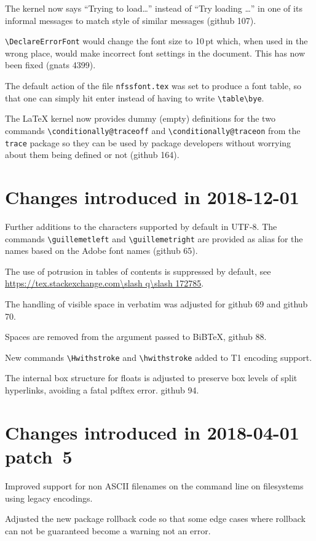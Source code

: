 \documentclass{ltxguide}
\newcommand\ghissue[1]{github #1}
\newcommand\gnatsissue[1]{gnats #1}
\newcommand\sxquestion[1]{\url{https://tex.stackexchange.com\slash q\slash #1}}
\newcommand\ghissue[1]{%
    \href{https://github.com/latex3/latex2e/issues/#1}{github #1}}
\newcommand\gnatsissue[1]{%
    \href{https://www.latex-project.org/cgi-bin/ltxbugs2html?pr=latex/#1}{gnats #1}}
\newcommand\sxquestion[1]{%
     \url{https://tex.stackexchange.com/q/#1}}
\begin{document}
The kernel now says ``Trying to load\ldots''
instead of ``Try loading \ldots'' in one of its informal
messages to match style of similar messages (\ghissue{107}).

\verb|\DeclareErrorFont| would change the font size to 10\,pt which, when
used in the wrong place, would make incorrect font settings in the document.
This has now been fixed (\gnatsissue{4399}).

The default action of the file \texttt{nfssfont.tex} was set to produce a
font table, so that one can simply hit enter instead of having to write
\verb=\table\bye=.

The \LaTeX{} kernel now provides dummy (empty) definitions for the two
commands \verb|\conditionally@traceoff| and
\verb|\conditionally@traceon| from the \texttt{trace} package so they
can be used by package developers without worrying about them being
defined or not (\ghissue{164}).





\section{Changes introduced in 2018-12-01}

Further additions to the characters supported by default in UTF-8.
The commands \verb|\guillemetleft| and \verb|\guillemetright| are
provided as alias for the names based on the Adobe font names
(\ghissue{65}).

The use of potrusion in tables of contents is suppressed by default,
see \sxquestion{172785}.

The handling of visible space in verbatim was adjusted for
\ghissue{69} and \ghissue{70}.

Spaces are removed from the argument passed to BiBTeX, \ghissue{88}.

New commands \verb|\Hwithstroke| and \verb|\hwithstroke| added to T1 encoding support.

The internal box structure for floats is adjusted to preserve box
levels of split hyperlinks, avoiding a fatal pdftex error. \ghissue{94}.


\section{Changes  introduced in 2018-04-01 patch~5}
Improved support for non ASCII filenames on the command line on
filesystems using legacy encodings.

Adjusted the new package rollback code so that some edge cases where rollback
can not be guaranteed become a warning not an error.
\end{document}
